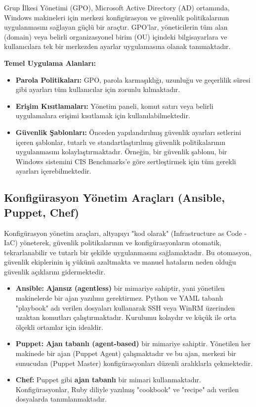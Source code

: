 Grup İlkesi Yönetimi (GPO), Microsoft Active Directory (AD) ortamında, Windows makineleri için merkezi konfigürasyon ve güvenlik politikalarının uygulanmasını sağlayan güçlü bir araçtır. GPO'lar, yöneticilerin tüm alan (domain) veya belirli organizasyonel birim (OU) içindeki bilgisayarlara ve kullanıcılara tek bir merkezden ayarlar uygulamasına olanak tanımaktadır.

\textbf{Temel Uygulama Alanları:}
\begin{itemize}
    \item \textbf{Parola Politikaları:} GPO, parola karmaşıklığı, uzunluğu ve geçerlilik süresi gibi ayarları tüm kullanıcılar için zorunlu kılmaktadır.
    \item \textbf{Erişim Kısıtlamaları:} Yönetim paneli, komut satırı veya belirli uygulamalara erişimi kısıtlamak için kullanılabilmektedir.
    \item \textbf{Güvenlik Şablonları:} Önceden yapılandırılmış güvenlik ayarları setlerini içeren şablonlar, tutarlı ve standartlaştırılmış güvenlik politikalarının uygulanmasını kolaylaştırmaktadır. Örneğin, bir güvenlik şablonu, bir Windows sistemini CIS Benchmarks'e göre sertleştirmek için tüm gerekli ayarları içerebilmektedir.
\end{itemize}

\subsection{Konfigürasyon Yönetim Araçları (Ansible, Puppet, Chef)}

Konfigürasyon yönetim araçları, altyapıyı "kod olarak" (Infrastructure as Code - IaC) yöneterek, güvenlik politikalarının ve konfigürasyonların otomatik, tekrarlanabilir ve tutarlı bir şekilde uygulanmasını sağlamaktadır. Bu otomasyon, güvenlik ekiplerinin iş yükünü azaltmakta ve manuel hataların neden olduğu güvenlik açıklarını gidermektedir.

\begin{itemize}
    \item \textbf{Ansible:} \textbf{Ajansız (agentless)} bir mimariye sahiptir, yani yönetilen makinelerde bir ajan yazılımı gerektirmez. Python ve YAML tabanlı "playbook" adı verilen dosyaları kullanarak SSH veya WinRM üzerinden uzaktan komutları çalıştırmaktadır. Kurulumu kolaydır ve küçük ile orta ölçekli ortamlar için idealdir.
    \item \textbf{Puppet:} \textbf{Ajan tabanlı (agent-based)} bir mimariye sahiptir. Yönetilen her makinede bir ajan (Puppet Agent) çalışmaktadır ve bu ajan, merkezi bir sunucudan (Puppet Master) konfigürasyonları düzenli aralıklarla çekmektedir.
    \item \textbf{Chef:} Puppet gibi \textbf{ajan tabanlı} bir mimari kullanmaktadır. Konfigürasyonlar, Ruby diliyle yazılmış "cookbook" ve "recipe" adı verilen dosyalarda tanımlanmaktadır.
\end{itemize}


